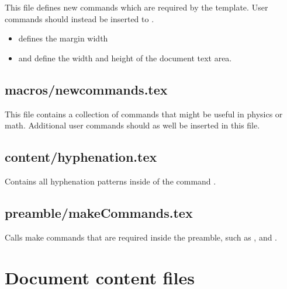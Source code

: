This file defines new commands which are required by the template. User commands should instead be inserted to .

\begin{itemize}
\item {} defines the margin width
\item {} and  define the width and height of the document text area.
\end{itemize}


\section{macros/newcommands.tex}

This file contains a collection of commands that might be useful in physics or math. Additional user commands should as well be inserted in this file.


\section{content/hyphenation.tex}

Contains all hyphenation patterns inside of the command .


\section{preamble/makeCommands.tex}

Calls make commands that are required inside the preamble, such as 
,  and .


\chapter{Document content files}

